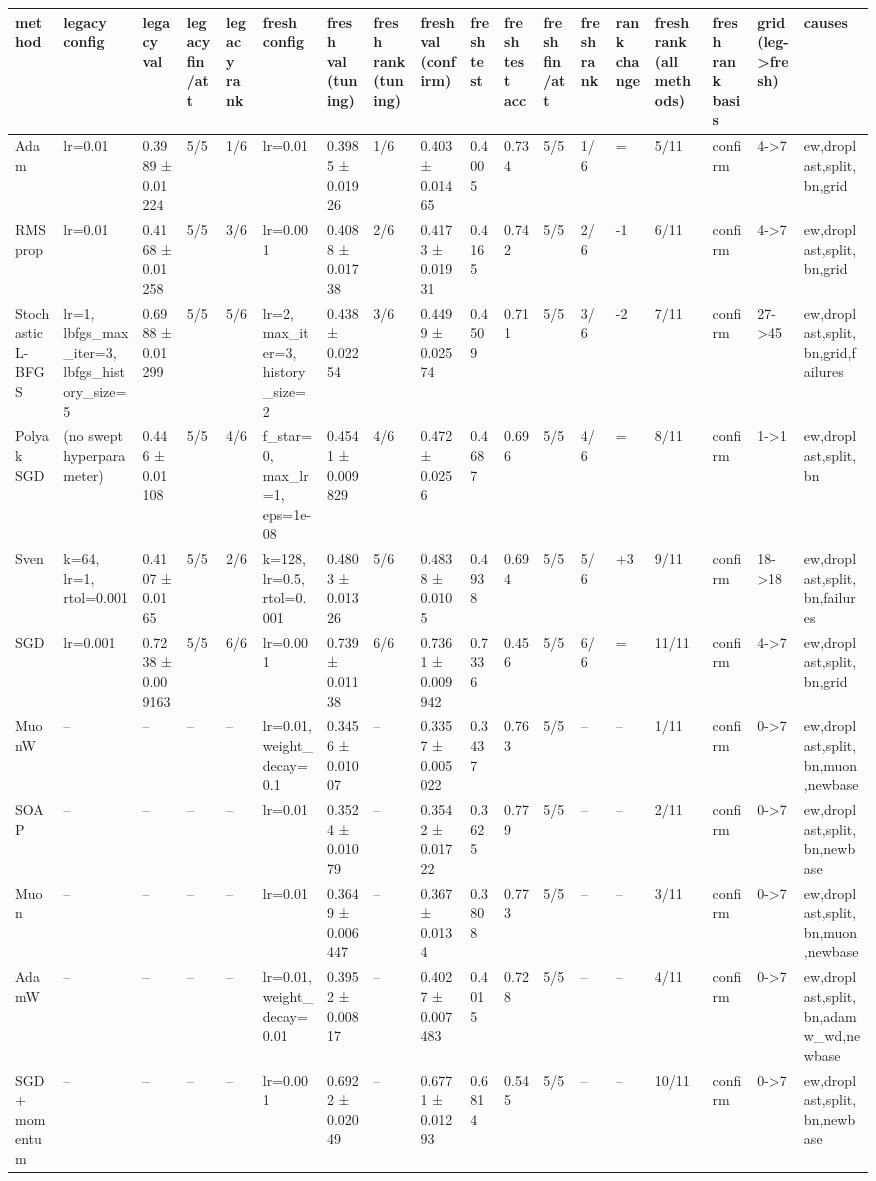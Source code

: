 \begin{tabular}{llllllllllllllllll}
\toprule
method & legacy config & legacy val & legacy fin/att & legacy rank & fresh config & fresh val (tuning) & fresh rank (tuning) & fresh val (confirm) & fresh test & fresh test acc & fresh fin/att & fresh rank & rank change & fresh rank (all methods) & fresh rank basis & grid (leg->fresh) & causes \\
\midrule
Adam & lr=0.01 & 0.3989 ± 0.01224 & 5/5 & 1/6 & lr=0.01 & 0.3985 ± 0.01926 & 1/6 & 0.403 ± 0.01465 & 0.4005 & 0.734 & 5/5 & 1/6 & = & 5/11 & confirm & 4->7 & ew,droplast,split,bn,grid \\
RMSprop & lr=0.01 & 0.4168 ± 0.01258 & 5/5 & 3/6 & lr=0.001 & 0.4088 ± 0.01738 & 2/6 & 0.4173 ± 0.01931 & 0.4165 & 0.742 & 5/5 & 2/6 & -1 & 6/11 & confirm & 4->7 & ew,droplast,split,bn,grid \\
Stochastic L-BFGS & lr=1, lbfgs\_max\_iter=3, lbfgs\_history\_size=5 & 0.6988 ± 0.01299 & 5/5 & 5/6 & lr=2, max\_iter=3, history\_size=2 & 0.438 ± 0.02254 & 3/6 & 0.4499 ± 0.02574 & 0.4509 & 0.711 & 5/5 & 3/6 & -2 & 7/11 & confirm & 27->45 & ew,droplast,split,bn,grid,failures \\
Polyak SGD & (no swept hyperparameter) & 0.446 ± 0.01108 & 5/5 & 4/6 & f\_star=0, max\_lr=1, eps=1e-08 & 0.4541 ± 0.009829 & 4/6 & 0.472 ± 0.0256 & 0.4687 & 0.696 & 5/5 & 4/6 & = & 8/11 & confirm & 1->1 & ew,droplast,split,bn \\
Sven & k=64, lr=1, rtol=0.001 & 0.4107 ± 0.0165 & 5/5 & 2/6 & k=128, lr=0.5, rtol=0.001 & 0.4803 ± 0.01326 & 5/6 & 0.4838 ± 0.0105 & 0.4938 & 0.694 & 5/5 & 5/6 & +3 & 9/11 & confirm & 18->18 & ew,droplast,split,bn,failures \\
SGD & lr=0.001 & 0.7238 ± 0.009163 & 5/5 & 6/6 & lr=0.001 & 0.739 ± 0.01138 & 6/6 & 0.7361 ± 0.009942 & 0.7336 & 0.456 & 5/5 & 6/6 & = & 11/11 & confirm & 4->7 & ew,droplast,split,bn,grid \\
MuonW & -- & -- & -- & -- & lr=0.01, weight\_decay=0.1 & 0.3456 ± 0.01007 & -- & 0.3357 ± 0.005022 & 0.3437 & 0.763 & 5/5 & -- & -- & 1/11 & confirm & 0->7 & ew,droplast,split,bn,muon,newbase \\
SOAP & -- & -- & -- & -- & lr=0.01 & 0.3524 ± 0.01079 & -- & 0.3542 ± 0.01722 & 0.3625 & 0.779 & 5/5 & -- & -- & 2/11 & confirm & 0->7 & ew,droplast,split,bn,newbase \\
Muon & -- & -- & -- & -- & lr=0.01 & 0.3649 ± 0.006447 & -- & 0.367 ± 0.0134 & 0.3808 & 0.773 & 5/5 & -- & -- & 3/11 & confirm & 0->7 & ew,droplast,split,bn,muon,newbase \\
AdamW & -- & -- & -- & -- & lr=0.01, weight\_decay=0.01 & 0.3952 ± 0.00817 & -- & 0.4027 ± 0.007483 & 0.4015 & 0.728 & 5/5 & -- & -- & 4/11 & confirm & 0->7 & ew,droplast,split,bn,adamw\_wd,newbase \\
SGD + momentum & -- & -- & -- & -- & lr=0.001 & 0.6922 ± 0.02049 & -- & 0.6771 ± 0.01293 & 0.6814 & 0.545 & 5/5 & -- & -- & 10/11 & confirm & 0->7 & ew,droplast,split,bn,newbase \\
\bottomrule
\end{tabular}
